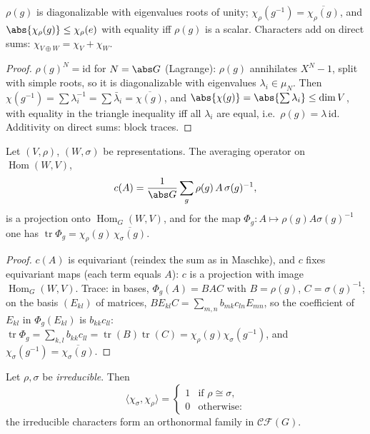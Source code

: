 \begin{proposition}\label{prop:b3:representations:charbasics}
$\rho(g)$ is diagonalizable with eigenvalues roots of unity;
$\chi_\rho(g^{-1}) = \overline{\chi_\rho(g)}$, and
$\abs{\chi_\rho(g)} \leq \chi_\rho(e)$ with equality iff
$\rho(g)$ is a scalar. Characters add on direct sums: $\chi_{V
\oplus W} = \chi_V + \chi_W$.
\end{proposition}

\begin{proof}
$\rho(g)^N = \mathrm{id}$ for $N = \abs G$ (Lagrange): $\rho(g)$
annihilates $X^N - 1$, split with simple roots, so it is
diagonalizable with eigenvalues $\lambda_i \in \mu_N$. Then
$\chi(g^{-1}) = \sum \lambda_i^{-1} = \sum\bar\lambda_i =
\overline{\chi(g)}$, and $\abs{\chi(g)} = \abs{\sum\lambda_i}
\leq \dim V$, with equality in the triangle inequality iff all
$\lambda_i$ are equal, i.e.\ $\rho(g) = \lambda\,\mathrm{id}$.
Additivity on direct sums: block traces.
\end{proof}

\begin{lemma}\label{lem:b3:representations:homtrace}
Let $(V, \rho)$, $(W, \sigma)$ be representations. The averaging
operator on $\operatorname{Hom}(W, V)$,
\[
c(A) = \frac1{\abs G}\sum_{g}\rho(g)\,A\,\sigma(g)^{-1},
\]
is a projection onto $\operatorname{Hom}_G(W, V)$, and for the
map $\Phi_g \colon A \mapsto \rho(g)A\sigma(g)^{-1}$ one has
$\operatorname{tr}\Phi_g =
\chi_\rho(g)\,\overline{\chi_\sigma(g)}$.
\end{lemma}

\begin{proof}
$c(A)$ is equivariant (reindex the sum as in Maschke), and $c$
fixes equivariant maps (each term equals $A$): $c$ is a
projection with image $\operatorname{Hom}_G(W, V)$. Trace: in
bases, $\Phi_g(A) = BAC$ with $B = \rho(g)$, $C = \sigma(g)^{-1}$;
on the basis $(E_{kl})$ of matrices, $BE_{kl}C = \sum_{m,n}
b_{mk}c_{ln}E_{mn}$, so the coefficient of $E_{kl}$ in
$\Phi_g(E_{kl})$ is $b_{kk}c_{ll}$: $\operatorname{tr}\Phi_g =
\sum_{k,l}b_{kk}c_{ll} = \operatorname{tr}(B)
\operatorname{tr}(C) = \chi_\rho(g)\chi_\sigma(g^{-1})$, and
$\chi_\sigma(g^{-1}) = \overline{\chi_\sigma(g)}$.
\end{proof}

\begin{theorem}
\label{thm:b3:representations:orthogonality}
Let $\rho, \sigma$ be \emph{irreducible}. Then
\[
\langle\chi_\sigma, \chi_\rho\rangle =
\begin{cases}
1 & \text{if } \rho \cong \sigma,\\
0 & \text{otherwise:}
\end{cases}
\]
the irreducible characters form an orthonormal family in
$\mathcal{CF}(G)$.
\end{theorem}


